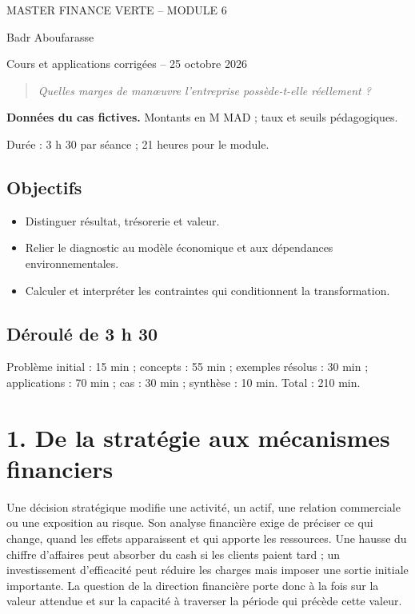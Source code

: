 \documentclass[12pt,a4paper]{article}
\begin{document}
\begin{center}{\small MASTER FINANCE VERTE -- MODULE 6}\par\vspace{8pt}{\Large\bfseries Séance 1 -- Diagnostic financier et capacité de transformation}\par\vspace{6pt}Badr Aboufarasse\par{\small Cours et applications corrigées -- 25 octobre 2026}\end{center}
\begin{quote}\itshape Quelles marges de manœuvre l’entreprise possède-t-elle réellement ?\end{quote}
\textbf{Données du cas fictives.} Montants en M MAD ; taux et seuils pédagogiques.\par Durée : 3 h 30 par séance ; 21 heures pour le module.

\subsection*{Objectifs}
\begin{itemize}\item Distinguer résultat, trésorerie et valeur.\item Relier le diagnostic au modèle économique et aux dépendances environnementales.\item Calculer et interpréter les contraintes qui conditionnent la transformation.\end{itemize}
\subsection*{Déroulé de 3 h 30}
Problème initial : 15 min ; concepts : 55 min ; exemples résolus : 30 min ; applications : 70 min ; cas : 30 min ; synthèse : 10 min. Total : 210 min.

\section*{1. De la stratégie aux mécanismes financiers}
Une décision stratégique modifie une activité, un actif, une relation commerciale ou une exposition au risque. Son analyse financière exige de préciser ce qui change, quand les effets apparaissent et qui apporte les ressources. Une hausse du chiffre d’affaires peut absorber du cash si les clients paient tard ; un investissement d’efficacité peut réduire les charges mais imposer une sortie initiale importante. La question de la direction financière porte donc à la fois sur la valeur attendue et sur la capacité à traverser la période qui précède cette valeur.
\end{document}
